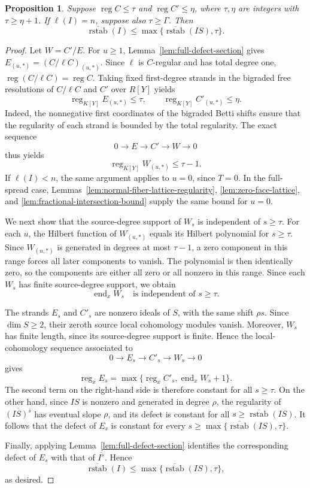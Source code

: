 \documentclass[12pt]{amsart}
\numberwithin{equation}{section}
\newtheorem{proposition}[theorem]{Proposition}
\theoremstyle{definition}
\theoremstyle{remark}
\numberwithin{equation}{section}
\DeclareMathOperator{\reg}{reg}
\newcommand{\rstabn}{\overline{\operatorname{rstab}}}
\begin{document}
\begin{proposition}\label{prop:stabilization-transfer}
	Suppose $\reg C\le\tau$ and $\reg C'\le\eta$, where $\tau,\eta$ are integers with $\tau\ge\eta+1$. If $\ell(I)=n$, suppose also
	$\tau\ge\Gamma$. Then
	\[
	\rstabn(I)\le\max\{\rstabn(IS),\tau\}.
	\]
\end{proposition}
\begin{proof}
 	Let $W=C'/E$. For $u\ge1$, Lemma~\ref{lem:full-defect-section} gives $E_{(u,*)}=(C/\ell C)_{(u,*)}$. Since $\ell$ is $C$-regular and has
	total degree one, $\reg(C/\ell C)=\reg C$. Taking fixed first-degree strands in the bigraded free resolutions of $C/\ell C$ and $C'$ over $R[Y]$ yields
	\[
	\reg_{K[Y]}E_{(u,*)}\le\tau,\qquad
	\reg_{K[Y]}C'_{(u,*)}\le\eta.
	\]
	Indeed, the nonnegative first coordinates of the bigraded Betti shifts ensure that the regularity of each strand is bounded by the total regularity.
The exact sequence 
\[
0\longrightarrow E\longrightarrow C'\longrightarrow W\longrightarrow0
\]
 thus yields
	\[
	\reg_{K[Y]}W_{(u,*)}\le\tau-1.
	\]
	If $\ell(I)<n$, the same argument applies to $u=0$, since $T=0$.
In the full-spread case,  Lemmas~\ref{lem:normal-fiber-lattice-regularity}, \ref{lem:zero-face-lattice}, and \ref{lem:fractional-intersection-bound} supply
 the same bound for $u=0$.
 
	We next show that the source-degree support of $W_s$ is independent of $s\ge\tau$.
 For each $u$, the Hilbert function of $W_{(u,*)}$ equals its Hilbert polynomial for $s\ge\tau$. Since $W_{(u,*)}$ is generated in degrees at most $\tau-1$, a zero component in this range forces all later components to vanish. The polynomial is then identically zero, so the components are either all zero or all nonzero in this range. Since each $W_s$ has finite source-degree support, we obtain
	\[
	\operatorname{end}_x W_s
	\quad\text{is independent of }s\ge\tau.
	\]
		
	The strands $E_s$ and $C'_s$ are nonzero ideals of $S$, with the same shift $\rho s$. Since $\dim S\ge2$, their zeroth source local cohomology modules vanish.  Moreover, $W_s$ has finite length, since its source-degree support is finite. Hence the local-cohomology sequence associated to
\[
0\longrightarrow E_s\longrightarrow C'_s
\longrightarrow W_s\longrightarrow0
\]
gives
\[
\reg_xE_s=
\max\{\reg_xC'_s,\operatorname{end}_xW_s+1\}.
\]
The second term on the right-hand side is therefore constant for all $s\ge\tau$. On the other hand, since $IS$ is nonzero and generated in degree $\rho$,  the regularity of $\overline{(IS)^s}$ has eventual slope $\rho$, and its defect is constant for all $s\ge\rstabn(IS)$.
It follows that the defect of $E_s$ is constant for every
$s\ge\max\{\rstabn(IS),\tau\}$.

	Finally, applying Lemma~\ref{lem:full-defect-section} identifies the corresponding defect of $E_s$ with  that of $\overline{I^s}$. Hence
\[
\rstabn(I)\le\max\{\rstabn(IS),\tau\},
\]
as desired.
\end{proof}
\end{document}
